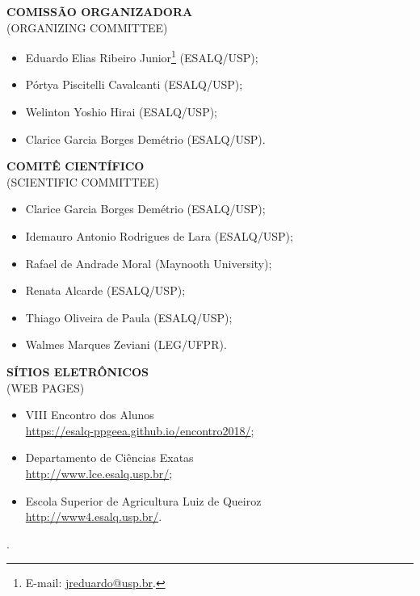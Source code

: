 \documentclass[twoside, a4paper]{article}
\newcommand{\blankpage}{
  \begin{titlepage}\centering . \end{titlepage}
}
\begin{document}
\begin{titlepage}
  \noindent
  \textbf{COMISSÃO ORGANIZADORA}\\
  (ORGANIZING COMMITTEE)
  \begin{itemize}
    \item Eduardo Elias Ribeiro Junior\footnote{E-mail:
        \url{jreduardo@usp.br}.} (ESALQ/USP);
    \item Pórtya Piscitelli Cavalcanti (ESALQ/USP);
    \item Welinton Yoshio Hirai (ESALQ/USP);
    \item Clarice Garcia Borges Demétrio (ESALQ/USP).
  \end{itemize}
  \vspace{1cm}
  \noindent
  \textbf{COMITÊ CIENTÍFICO}\\
  (SCIENTIFIC COMMITTEE)
  \begin{itemize}
    \item Clarice Garcia Borges Demétrio (ESALQ/USP);
    \item Idemauro Antonio Rodrigues de Lara (ESALQ/USP);
    \item Rafael de Andrade Moral (Maynooth University);
    \item Renata Alcarde (ESALQ/USP);
    \item Thiago Oliveira de Paula (ESALQ/USP);
    \item Walmes Marques Zeviani (LEG/UFPR).
  \end{itemize}
  \vspace{1cm}
  \noindent
  \textbf{SÍTIOS ELETRÔNICOS}\\
  (WEB PAGES)
  \begin{itemize}
    \item VIII Encontro dos Alunos\\
      \url{https://esalq-ppgeea.github.io/encontro2018/};
    \item Departamento de Ciências Exatas\\
      \url{http://www.lce.esalq.usp.br/};
    \item Escola Superior de Agricultura Luiz de Queiroz\\
      \url{http://www4.esalq.usp.br/}.
  \end{itemize}
  \vspace{1cm}
\end{titlepage}
\blankpage
\end{document}
